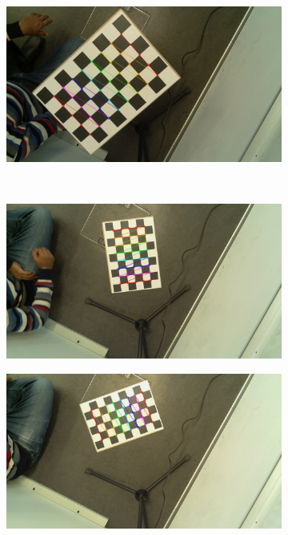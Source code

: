 \begin{figure}[H]
\begin{subfigure}{0.24\linewidth}
    \end{subfigure}
    \begin{subfigure}{0.24\linewidth}
        \includegraphics[width=\linewidth]{files/output145_4.jpg}
    \end{subfigure} \\
    \begin{subfigure}{0.24\linewidth}
        \includegraphics[width=\linewidth]{files/output145_5.jpg}
    \end{subfigure}
    \begin{subfigure}{0.24\linewidth}
        \includegraphics[width=\linewidth]{files/output145_6.jpg}

\end{subfigure}
\end{figure}
